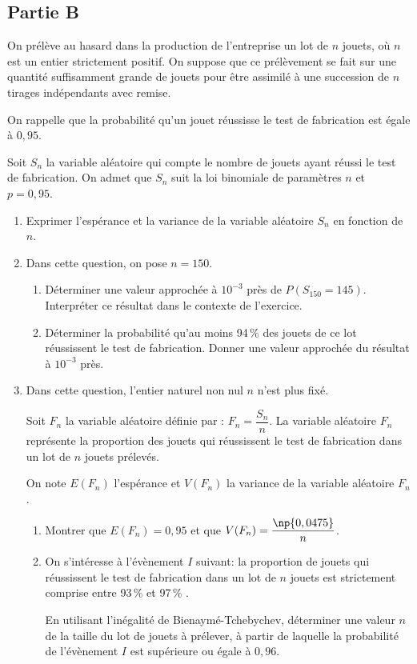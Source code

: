\subsection*{Partie B}

On prélève au hasard dans la production de l'entreprise un lot de $n$ jouets, où $n$ est un entier strictement positif. On suppose que ce prélèvement se fait sur une quantité suffisamment grande de jouets pour être assimilé à une succession de $n$ tirages indépendants avec remise.

On rappelle que la probabilité qu'un jouet réussisse le test de fabrication est égale à $0,95$.

Soit $S_n$ la variable aléatoire qui compte le nombre de jouets ayant réussi le test de fabrication. On
admet que $S_n$ suit la loi binomiale de paramètres $n$ et $p = 0,95$.

\medskip

\begin{enumerate}
\item Exprimer l'espérance et la variance de la variable aléatoire $S_n$ en fonction de $n$.
\item Dans cette question, on pose $n = 150$.
	\begin{enumerate}
		\item Déterminer une valeur approchée à $10^{-3}$ près de $P\left(S_{150} = 145\right)$. Interpréter ce résultat dans le contexte de l'exercice.
		\item Déterminer la probabilité qu'au moins 94\,\% des jouets de ce lot réussissent le test de
fabrication. Donner une valeur approchée du résultat à $10^{-3}$ près.
	\end{enumerate}
\item Dans cette question, l'entier naturel non nul $n$ n'est plus fixé.

Soit $F_n$ la variable aléatoire définie par : $F_n = \dfrac{S_n}{n}$. La variable aléatoire $F_n$ représente la proportion des jouets qui réussissent le test de fabrication dans un lot de $n$ jouets prélevés.

On note $E(F_n)$ l'espérance et $V(F_n)$ la variance de la variable aléatoire $F_n$.
	\begin{enumerate}
		\item Montrer que $E(F_n) = 0,95$ et que $V(F_n) = \dfrac{\np{0,0475}}{n}$.
		\item On s'intéresse à l'évènement $I$ suivant: \og la proportion de jouets qui réussissent le test de fabrication dans un lot de $n$ jouets est strictement comprise entre 93\,\% et 97\,\% \fg.

En utilisant l'inégalité de Bienaymé-Tchebychev, déterminer une valeur $n$ de la taille du lot
de jouets à prélever, à partir de laquelle la probabilité de l'évènement $I$ est supérieure ou égale à $0,96$.
	\end{enumerate}
\end{enumerate}
